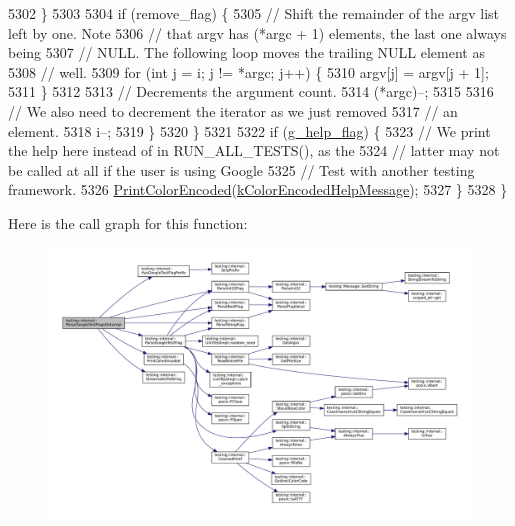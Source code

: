 \begin{DoxyCode}
5302     \}
5303 
5304     \textcolor{keywordflow}{if} (remove\_flag) \{
5305       \textcolor{comment}{// Shift the remainder of the argv list left by one.  Note}
5306       \textcolor{comment}{// that argv has (*argc + 1) elements, the last one always being}
5307       \textcolor{comment}{// NULL.  The following loop moves the trailing NULL element as}
5308       \textcolor{comment}{// well.}
5309       \textcolor{keywordflow}{for} (\textcolor{keywordtype}{int} j = i; j != *argc; j++) \{
5310         argv[j] = argv[j + 1];
5311       \}
5312 
5313       \textcolor{comment}{// Decrements the argument count.}
5314       (*argc)--;
5315 
5316       \textcolor{comment}{// We also need to decrement the iterator as we just removed}
5317       \textcolor{comment}{// an element.}
5318       i--;
5319     \}
5320   \}
5321 
5322   \textcolor{keywordflow}{if} (\hyperlink{namespacetesting_1_1internal_a93a772f5e51973b105d91cbb66a203f4}{g\_help\_flag}) \{
5323     \textcolor{comment}{// We print the help here instead of in RUN\_ALL\_TESTS(), as the}
5324     \textcolor{comment}{// latter may not be called at all if the user is using Google}
5325     \textcolor{comment}{// Test with another testing framework.}
5326     \hyperlink{namespacetesting_1_1internal_a7d8c446a29c7e22d7d4dde8f530bb57e}{PrintColorEncoded}(\hyperlink{namespacetesting_1_1internal_a159395e649dd7728b09b25f70847f1ca}{kColorEncodedHelpMessage});
5327   \}
5328 \}
\end{DoxyCode}
Here is the call graph for this function\+:
\nopagebreak
\begin{figure}[H]
\begin{center}
\leavevmode
\includegraphics[width=350pt]{namespacetesting_1_1internal_ae4c46ce8c3d016848fff52cc5133f2ac_cgraph}
\end{center}
\end{figure}
